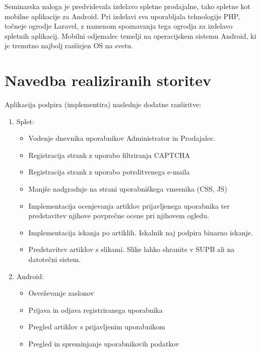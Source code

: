 \documentclass[a4paper,12pt]{report}
\begin{document}
Seminarska naloga je predvidevala izdelavo spletne prodajalne, tako spletne kot mobilne aplikacije za Android. Pri izdelavi sva uporabljala tehnologije PHP, točneje ogrodje Laravel, z namenom spoznavanja tega ogrodja za izdelavo spletnih aplikacij. Mobilni odjemalec temelji na operacijskem sistemu Android, ki je trenutno najbolj razširjen OS na svetu.


\chapter{Navedba realiziranih storitev}
Aplikacija podpira (implementira) naslednje dodatne razširitve:
\begin{enumerate}
    \item Splet:
    \begin{itemize}
        \item Vodenje dnevnika uporabnikov Administrator in Prodajalec.
        \item Registracija strank z uporabo filtriranja CAPTCHA
        \item Registracija strank z uporabo potrditvenega e-maila
        \item Manjše nadgradnje na strani uporabniškega vmesnika (CSS, JS)
        \item Implementacija ocenjevanja artiklov prijavljenega uporabnika ter predstavitev njihove povprečne ocene pri njihovem ogledu.
        \item Implementacija iskanja po artiklih. Iskalnik naj podpira binarno iskanje.
        \item Predstavitev artiklov s slikami. Slike lahko shranite v SUPB ali na datotečni sistem.
    \end{itemize}
    \item Android:
    \begin{itemize}
        \item Osveževanje zaslonov
        \item Prijava in odjava registriranega uporabnika
        \item Pregled artiklov s prijavljenim uporabnikom
        \item Pregled in spreminjanje uporabnikovih podatkov
    \end{itemize}
\end{enumerate}
\end{document}
